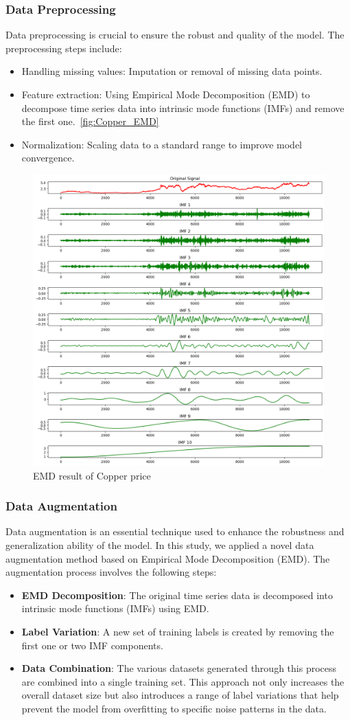 \documentclass[final-report]{report-template}
\begin{document}
\subsubsection{Data Preprocessing}
Data preprocessing is crucial to ensure the robust and quality of the model.  The preprocessing steps include: 
\begin{itemize}
    \item Handling missing values: Imputation or removal of missing data points.
    \item     Feature extraction: Using Empirical Mode Decomposition (EMD) to decompose time series data into intrinsic mode functions (IMFs) and remove the first one.~\autoref{fig:Copper_EMD}
    \item Normalization: Scaling data to a standard range to improve model convergence.
\end{itemize}
\begin{figure}[h]
    \centering
    \includegraphics[width=0.5\linewidth]{figures/EMD_copper.png}
    \caption{EMD result of Copper price}
    \label{fig:Copper_EMD}
\end{figure}
\subsubsection{\textbf{Data Augmentation}}
Data augmentation is an essential technique used to enhance the robustness and generalization ability of the model. In this study, we applied a novel data augmentation method based on Empirical Mode Decomposition (EMD). The augmentation process involves the following steps:
\begin{itemize}
    \item \textbf{EMD Decomposition}: The original time series data is decomposed into intrinsic mode functions (IMFs) using EMD. 
    \item \textbf{Label Variation}: A new set of training labels is created by removing the first one or two IMF components. 
    \item \textbf{Data Combination}: The various datasets generated through this process are combined into a single training set. This approach not only increases the overall dataset size but also introduces a range of label variations that help prevent the model from overfitting to specific noise patterns in the data.
\end{itemize}
\end{document}
